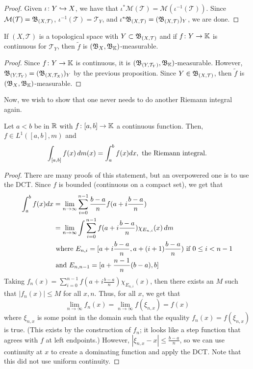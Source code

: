 \documentclass[11pt,leqno,oneside]{amsbook}
\numberwithin{thm}{section}
\newcommand{\M}{\mathcal{M}}
\newcommand{\Top}{\mathcal{T}} %
\newcommand{\K}{\mathbb{K}} %
\begin{document}
\begin{proof}
    Given \(\iota \colon Y \hookrightarrow X\), we have that \(\iota^* \M(\Top) =
  \M(\iota^{-1}(\Top))\). Since \(\M(\Top) = \B_{(X,\Top)}\),
  \(\iota^{-1}(\Top) = \Top_Y\), and \(\iota^* \B_{(X,\Top)} =
  (\B_{(X,\Top)})_Y\), we are done.
\end{proof}
\begin{prop}
  If \((X,\Top)\) is a topological space with \(Y \subset
  \B_{(X,\Top)}\) and if \(f \from Y \to \K\) is continuous for
  \(\Top_Y\), then \(\tilde{f}\) is \((\B_X, \B_\K)\)-measurable.
\end{prop}
\begin{proof}
  Since \(f \from Y \to \K\) is continuous, it is \((\B_{(Y,\Top_Y)},
  \B_\K)\)-measurable. However, \(\B_{(Y,\Top_Y)} =
  (\B_{(X,\Top_X)})_Y\) by the previous proposition. Since \(Y \in
  \B_{(X,\Top)}\), then \(\tilde{f}\) is \((\B_X, \B_\K)\)-measurable.
\end{proof}
Now, we wish to show that one never needs to do another Riemann
integral again.
\begin{thm}
  Let \(a<b\) be in \({\mathbb R}\) with \(f \from [a,b] \to \K\) a continuous
  function. Then, \(f \in L^1([a,b],m)\) and \[
    \int_{[a,b]} f(x) \, d m(x) = \int_a^b f(x) dx, \text{ the Riemann integral.}
  \]
\end{thm}
\begin{proof}
  There are many proofs of this statement, but an overpowered one is
  to use the DCT. Since \(f\) is bounded (continuous on a compact
  set), we get that
  \begin{align*}
    \int_a^b f(x) dx & = \lim_{n \to \infty} \sum_{i=0}^{n-1}
                       \frac{b-a}{n} f(a + i \frac{b-a}{n}) \\
    & = \lim_{n \to \infty} \int \sum_{i=0}^{n-1} f(a+i\frac{b-a}{n})
      \chi_{E_{n,i}}(x) \, d m \\
    & \text{ where }  E_{n,i} = [a+i\frac{b-a}{n},a+(i+1)\frac{b-a}{n})
      \text{ if } 0 \leq i < n-1 \\
    & \text{ and } E_{n,n-1} = [a+\frac{n-1}{n}(b-a), b]
  \end{align*}
Taking \(f_n(x) = \sum_{i=0}^{n-1} f(a+i \frac{b-a}{n})
\chi_{E_{n,i}}(x)\), then there exists an \(M\) such that \(|f_n(x)|
\leq M\) for all \(x,n\). Thus, for all \(x\), we get that \[
  \lim_{n \to \infty} f_n(x) = \lim_{n \to \infty} f(\xi_{n,x}) = f(x)
\]
where \(\xi_{n,x}\) is some point in the domain such that the equality
\(f_n(x) = f(\xi_{n,x})\) is true. (This exists by the construction of
\(f_n\); it looks like a step function that agrees with \(f\) at left
endpoints.) However, \(|\xi_{n,x}-x| \leq \frac{b-a}{n}\), so we can
use continuity at \(x\) to create a dominating function and apply the
DCT. Note that this did not use uniform continuity.
\end{proof}
\end{document}
